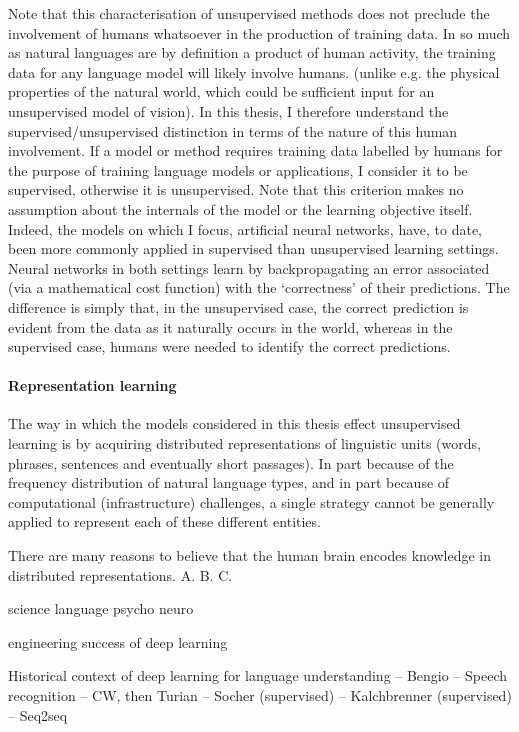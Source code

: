 Note that this characterisation of unsupervised methods does not preclude the involvement of humans whatsoever in the production of training data. In so much as natural languages are by definition a product of human activity, the training data for any language model will likely involve humans. (unlike e.g. the physical properties of the natural world, which could be sufficient input for an unsupervised model of vision). In this thesis, I therefore understand the supervised/unsupervised distinction in terms of the nature of this human involvement. If a model or method requires training data labelled by humans for the purpose of training language models or applications, I consider it to be supervised, otherwise it is unsupervised. Note that this criterion makes no assumption about the internals of the model or the learning objective itself. Indeed, the models on which I focus, artificial neural networks, have, to date, been more commonly applied in supervised than unsupervised learning settings. Neural networks in both settings learn by backpropagating an error associated (via a mathematical cost function) with the `correctness' of their predictions. The difference is simply that, in the unsupervised case, the correct prediction is evident from the data as it naturally occurs in the world, whereas in the supervised case, humans were needed to identify the correct predictions.  

\paragraph{Representation learning} The way in which the models considered in this thesis effect unsupervised learning is by acquiring distributed representations of linguistic units (words, phrases, sentences and eventually short passages). In part because of the frequency distribution of natural language types, and in part because of computational (infrastructure) challenges, a single strategy cannot be generally applied to represent each of these different entities. 

There are many reasons to believe that the human brain encodes knowledge in distributed representations. A. B. C. 

science
language
psycho
neuro

engineering
success of deep learning

Historical context of deep learning for language understanding
-- Bengio
-- Speech recognition
-- CW, then Turian
-- Socher (supervised)
-- Kalchbrenner (supervised)
-- Seq2seq
